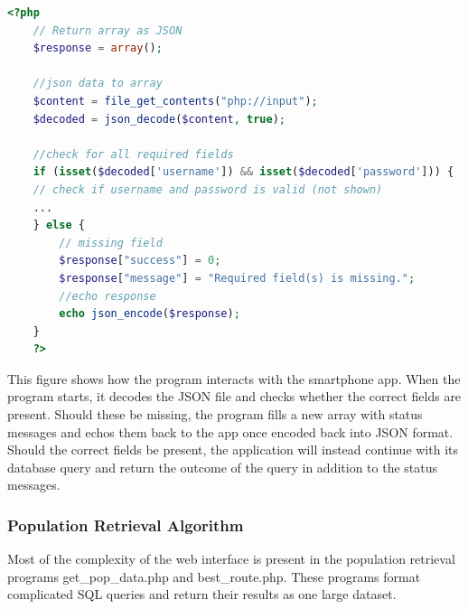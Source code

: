 \lstset{style=phpstyle}
\begin{lstlisting}[caption={\detokenize{How login_user.php interacts with the smartphone app.}},label={lst:php_login},language=php]
    <?php
    // Return array as JSON
    $response = array();

    //json data to array
    $content = file_get_contents("php://input");
    $decoded = json_decode($content, true);

    //check for all required fields
    if (isset($decoded['username']) && isset($decoded['password'])) {
    // check if username and password is valid (not shown)
    ... 
    } else {
        // missing field
        $response["success"] = 0;
        $response["message"] = "Required field(s) is missing.";
        //echo response
        echo json_encode($response);
    }
    ?>    
\end{lstlisting}


This figure shows how the program interacts with the smartphone app. When the program starts, it decodes the JSON file and checks whether the correct fields are present. Should these be missing, the program fills a new array with status messages and echos them back to the app once encoded back into JSON format. Should the correct fields be present, the application will instead continue with its database query and return the outcome of the query in addition to the status messages.

\subsubsection{Population Retrieval Algorithm}
Most of the complexity of the web interface is present in the population retrieval programs get\_pop\_data.php and best\_route.php. These programs format complicated SQL queries and return their results as one large dataset. 

